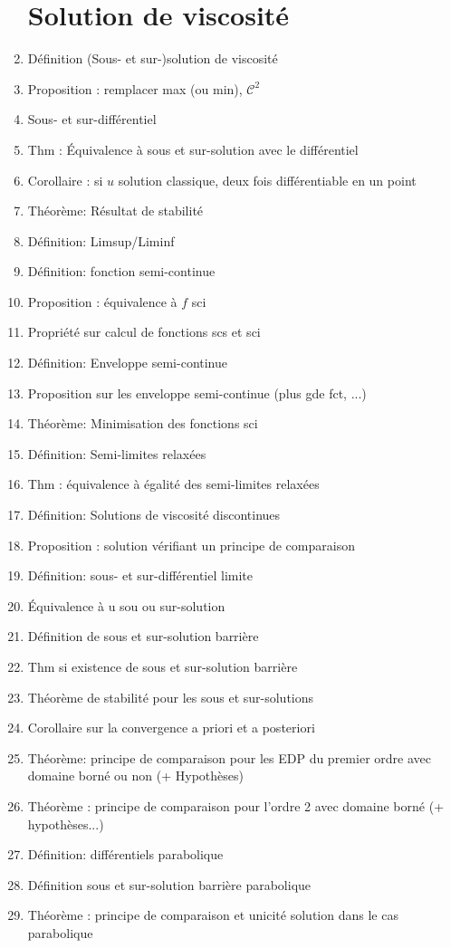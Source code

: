 \documentclass{article}
\begin{document}
\begin{enumerate}
\section{Solution de viscosité}
	\item Définition (Sous- et sur-)solution de viscosité
	\item Proposition : remplacer max (ou min), $\mathscr{C}^2$
	\item Sous- et sur-différentiel
	\item Thm : Équivalence à sous et sur-solution avec le différentiel
	\item Corollaire : si $u$ solution classique, deux fois différentiable en un point
	\item Théorème: Résultat de stabilité
	\item Définition: Limsup/Liminf
	\item Définition: fonction semi-continue
	\item Proposition : équivalence à $f$ sci
	\item Propriété sur calcul de fonctions scs et sci
	\item Définition: Enveloppe semi-continue
	\item Proposition sur les enveloppe semi-continue (plus gde fct, ...)
	\item Théorème: Minimisation des fonctions sci
	\item Définition: Semi-limites relaxées
	\item Thm : équivalence à égalité des semi-limites relaxées
	\item Définition: Solutions de viscosité discontinues
	\item Proposition : solution vérifiant un principe de comparaison
	\item Définition: sous- et sur-différentiel limite
	\item Équivalence à u sou ou sur-solution
	\item Définition de sous et sur-solution barrière
	\item Thm si existence de sous et sur-solution barrière
	\item Théorème de stabilité pour les sous et sur-solutions
	\item Corollaire sur la convergence a priori et a posteriori
	\item Théorème: principe de comparaison pour les EDP du premier ordre avec domaine borné ou non (+ Hypothèses)
	\item Théorème : principe de comparaison pour l'ordre 2 avec domaine borné (+ hypothèses...)
	\item Définition: différentiels parabolique
	\item Définition sous et sur-solution barrière parabolique
	\item Théorème : principe de comparaison et unicité solution dans le cas parabolique

\end{enumerate}
\end{document}
